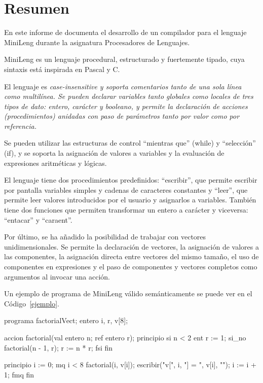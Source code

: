 
\vspace*{1cm}
\section*{\hfil Resumen \hfil}

En este informe de documenta el desarrollo de un compilador para el lenguaje MiniLeng durante la asignatura Procesadores de Lenguajes.

MiniLeng es un lenguaje procedural, estructurado y fuertemente tipado, cuya sintaxis está inspirada en Pascal y C.

El lenguaje es \it{case-insensitive} y soporta comentarios tanto de una sola línea como multilínea. Se pueden declarar variables tanto globales como locales de tres tipos de dato: entero, carácter y booleano, y permite la declaración de acciones (procedimientos) anidadas con paso de parámetros tanto por valor como por referencia.

Se pueden utilizar las estructuras de control ``mientras que'' (while) y ``selección'' (if), y se soporta la asignación de valores a variables y la evaluación de expresiones aritméticas y lógicas.

El lenguaje tiene dos procedimientos predefinidos: ``escribir'', que permite escribir por pantalla variables simples y cadenas de caracteres constantes y ``leer'', que permite leer valores introducidos por el usuario y asignarlos a variables. También tiene dos funciones que permiten transformar un entero a carácter y viceversa: ``entacar'' y ``caraent''.

Por último, se ha añadido la posibilidad de trabajar con vectores unidimensionales. Se permite la declaración de vectores, la asignación de valores a las componentes, la asignación directa entre vectores del mismo tamaño, el uso de componentes en expresiones y el paso de componentes y vectores completos como argumentos al invocar una acción.

Un ejemplo de programa de MiniLeng válido semánticamente se puede ver en el Código~\ref{ejemplo}.

\begin{minileng}[caption={Ejemplo de programa en MiniLeng.},label={ejemplo}]
programa factorialVect;
    entero i, r, v[8];

    accion factorial(val entero n; ref entero r);
    principio
        si n < 2 ent
            r := 1;
        si_no
            factorial(n - 1, r);
            r := n * r;
        fsi
    fin

principio
    i := 0;
    mq i < 8
        factorial(i, v[i]);
        escribir("v[", i, "] = ", v[i], "\n");
        i := i + 1;
    fmq
fin\end{minileng}


